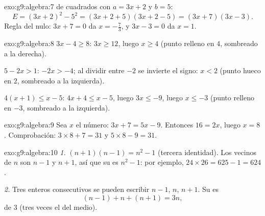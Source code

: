 \begin{solution}{exo:g9:algebra:7}
 de cuadrados con $a = 3x + 2$ y $b = 5$:
\[
E = (3x + 2)^2 - 5^2 = (3x + 2 + 5)(3x + 2 - 5) = (3x + 7)(3x - 3).
\]
Regla del  nulo: $3x + 7 = 0$ da $x = -\frac73$, y $3x - 3 = 0$
da $x = 1$.
\end{solution}

\begin{solution}{exo:g9:algebra:8}
$3x - 4 \geq 8$: $3x \geq 12$, luego $x \geq 4$ (punto relleno en $4$, sombreado
a la derecha).

$5 - 2x > 1$: $-2x > -4$; al dividir entre $-2$ se invierte el signo: $x < 2$
(punto hueco en $2$, sombreado a la izquierda).

$4(x+1) \leq x - 5$: $4x + 4 \leq x - 5$, luego $3x \leq -9$, luego
$x \leq -3$ (punto relleno en $-3$, sombreado a la izquierda).
\end{solution}

\begin{solution}{exo:g9:algebra:9}
Sea $x$ el número: $3x + 7 = 5x - 9$. Entonces $16 = 2x$, luego $x = 8$.
Comprobación: $3 \times 8 + 7 = 31$ y $5 \times 8 - 9 = 31$.
\end{solution}

\begin{solution}{exo:g9:algebra:10}
\emph{1.} $(n+1)(n-1) = n^2 - 1$ (tercera identidad). Los vecinos de $n$
son $n - 1$ y $n + 1$, así que su  es $n^2 - 1$: por ejemplo,
$24 \times 26 = 625 - 1 = 624$.

\emph{2.} Tres enteros consecutivos se pueden escribir $n - 1$, $n$,
$n + 1$. Su  es
\[
(n-1) + n + (n+1) = 3n ,
\]
 de $3$ (tres veces el del medio).
\end{solution}

